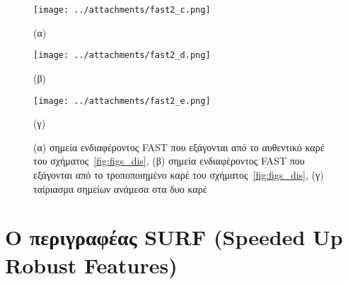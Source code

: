  \begin{figure}[!ht]
\begin{minipage}[b]{0.5\linewidth}
\centering
\texttt{[image: ../attachments/fast2\_c.png]}
\caption*{(α)}
\label{fig:fast_4}
\end{minipage}
\hspace{0.9cm}
\begin{minipage}[b]{0.5\linewidth}
\centering
\texttt{[image: ../attachments/fast2\_d.png]}
\caption*{(β)}
\label{fig:fast_5}
\end{minipage}

\end{figure}

\begin{figure}[!h]
\begin{minipage}[b]{1.0\linewidth}
\centering
\texttt{[image: ../attachments/fast2\_e.png]}
\caption*{(γ)}
\label{fig:fast_6}
\end{minipage}
\caption{(α) σημεία ενδιαφέροντος FAST που εξάγονται από το αυθεντικό καρέ του σχήματος~\ref{fig:figs_dis},
(β) σημεία ενδιαφέροντος FAST που εξάγονται από το τροποποιημένο καρέ του σχήματος~\ref{fig:figs_dis},
(γ) ταίριασμα σημείων ανάμεσα στα δυο καρέ}
\label{fig:fast_dis_figs} 
 \end{figure} 
 
\newpage %
 





\section{Ο περιγραφέας SURF (Speeded Up Robust Features)}

